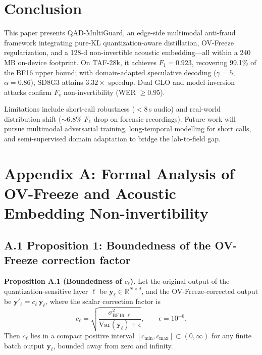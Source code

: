 \documentclass[11pt, a4paper]{article}
\begin{document}
\section{Conclusion}

This paper presents QAD-MultiGuard, an edge-side multimodal anti-fraud framework integrating pure-KL quantization-aware distillation, OV-Freeze regularization, and a 128-d non-invertible acoustic embedding---all within a 240\,MB on-device footprint. On TAF-28k, it achieves $F_1 = 0.923$, recovering 99.1\% of the BF16 upper bound; with domain-adapted speculative decoding ($\gamma = 5$, $\alpha = 0.86$), SD8G3 attains $3.32\times$ speedup. Dual GLO and model-inversion attacks confirm $F_v$ non-invertibility (WER $\ge 0.95$).

Limitations include short-call robustness ($<$8\,s audio) and real-world distribution shift ($\sim$6.8\% $F_1$ drop on forensic recordings). Future work will pursue multimodal adversarial training, long-temporal modelling for short calls, and semi-supervised domain adaptation to bridge the lab-to-field gap.

\appendix
\section*{Appendix A: Formal Analysis of OV-Freeze and Acoustic Embedding Non-invertibility}

\subsection*{A.1 Proposition 1: Boundedness of the OV-Freeze correction factor}

\noindent\textbf{Proposition A.1 (Boundedness of $c_\ell$).} Let the original output of the quantization-sensitive layer $\ell$ be $\bm{y}_\ell\in\mathbb{R}^{N\times d}$, and the OV-Freeze-corrected output be $\bm{y}'_\ell = c_\ell\,\bm{y}_\ell$, where the scalar correction factor is
\[
c_\ell = \sqrt{\frac{\sigma^2_{\mathrm{BF16},\ell}}{\mathrm{Var}(\bm{y}_\ell)+\epsilon}},\qquad \epsilon = 10^{-6}.
\]
Then $c_\ell$ lies in a compact positive interval $[c_{\min}, c_{\max}] \subset (0, \infty)$ for any finite batch output $\bm{y}_\ell$, bounded away from zero and infinity.
\end{document}
